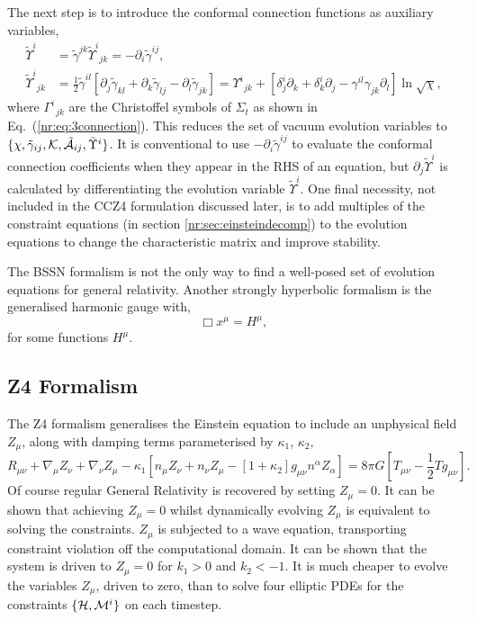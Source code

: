 The next step is to introduce the conformal connection functions as auxiliary variables, 
\begin{align} 
\tilde{\Upsilon}^i &= \tilde{\gamma}^{jk}\tilde{\Upsilon}^i_{\,\;jk} = -\partial_i \tilde{\gamma}^{ij},\\
 \tilde{\Upsilon}^i_{\,\;jk} &= \frac{1}{2}\tilde{\gamma}^{il}\left[ \partial_j \tilde{\gamma}_{kl} + \partial_k \tilde{\gamma}_{lj} - \partial_l \tilde{\gamma}_{jk}\right] = \Upsilon^i_{\;\,jk} + \left[ \delta^i_j \partial_k + \delta^i_k \partial_j - \gamma^{il}\gamma_{jk}\partial_l\right] \ln \sqrt{\chi},
 \end{align}
where $\Gamma^i_{\,\,\,jk}$ are the Christoffel symbols of $\Sigma_t$ as shown in Eq.~(\ref{nr:eq:3connection}).
This reduces the set of vacuum evolution variables to $\{\chi,\tilde{\gamma}_{ij},\mathcal{K},\tilde{\mathcal{A}}_{ij},\tilde{\Upsilon}^i \}$. It is conventional to use $-\partial_i \tilde{\gamma}^{ij}$ to evaluate the conformal connection coefficients when they appear in the RHS of an equation, but $\partial_j \tilde{\Upsilon}^i$ is calculated by differentiating the evolution variable $\tilde{\Upsilon}^i$. One final necessity, not included in the CCZ4 formulation discussed later, is to add multiples of the constraint equations (in section \ref{nr:sec:einsteindecomp}) to the evolution equations to change the characteristic matrix and improve stability. 

The BSSN formalism is not the only way to find a well-posed set of evolution equations for general relativity. Another strongly hyperbolic formalism is the generalised harmonic gauge \cite{garfinkle2002harmonic} \cite{Garfinkle:2001ni} \cite{Pretorius:2005gq} with, 
\begin{equation}\Box x^\mu = H^\mu,\end{equation}
for some functions $H^\mu$.


\subsection{Z4 Formalism}
The Z4 formalism \cite{gundlach2005constraint} generalises the Einstein equation to include an unphysical field $Z_\mu$, along with damping terms parameterised by $\kappa_1$, $\kappa_2$, 
\begin{equation}\label{nr:eq:z4einstein} R_{\mu\nu} + \nabla_\mu Z_\nu + \nabla_\nu Z_\mu - \kappa_1\left[ n_\mu Z_\nu + n_\nu Z_\mu - [1+\kappa_2]g_{\mu\nu}n^\alpha Z_\alpha\right] = 8\pi G \left[T_{\mu\nu}- \frac{1}{2}Tg_{\mu\nu} \right].\end{equation}
Of course regular General Relativity is recovered by setting $Z_\mu=0$. It can be shown that achieving $Z_\mu=0$ whilst dynamically evolving $Z_\mu$  is equivalent to solving the constraints. $Z_\mu$ is subjected to a wave equation, transporting constraint violation off the computational domain. It can be shown that the system is driven to $Z_\mu =0$ for $k_1>0$ and $k_2<-1$. It is much cheaper to evolve the variables $Z_\mu$, driven to zero, than to solve four elliptic PDEs for the constraints $\{\mathcal{H},\mathcal{M}^i\}$ on each timestep. 


